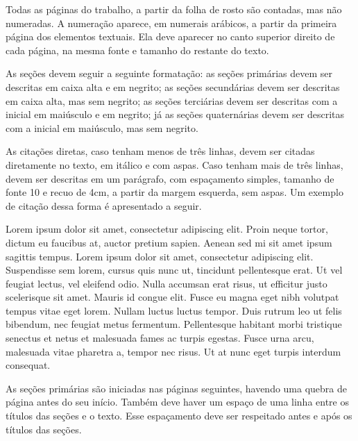 Todas as páginas do trabalho, a partir da folha de rosto são contadas, mas não numeradas. A numeração aparece, em numerais arábicos, a partir da primeira página dos elementos textuais. Ela deve aparecer no canto superior direito de cada página, na mesma fonte e tamanho do restante do texto.

As seções devem seguir a seguinte formatação: as seções primárias devem ser descritas em caixa alta e em negrito; as seções secundárias devem ser descritas em caixa alta, mas sem negrito; as seções terciárias devem ser descritas com a inicial em maiúsculo e em negrito; já as seções quaternárias devem ser descritas com a inicial em maiúsculo, mas sem negrito.

As citações diretas, caso tenham menos de três linhas, devem ser citadas diretamente no texto, em itálico e com aspas. Caso tenham mais de três linhas, devem ser descritas em um parágrafo, com espaçamento simples, tamanho de fonte 10 e recuo de 4cm, a partir da margem esquerda, sem aspas. Um exemplo de citação dessa forma é apresentado a seguir.

\begin{citacao}
Lorem ipsum dolor sit amet, consectetur adipiscing elit. Proin neque tortor, dictum eu faucibus at, auctor pretium sapien. Aenean sed mi sit amet ipsum sagittis tempus. Lorem ipsum dolor sit amet, consectetur adipiscing elit. Suspendisse sem lorem, cursus quis nunc ut, tincidunt pellentesque erat. Ut vel feugiat lectus, vel eleifend odio. Nulla accumsan erat risus, ut efficitur justo scelerisque sit amet. Mauris id congue elit. Fusce eu magna eget nibh volutpat tempus vitae eget lorem. Nullam luctus luctus tempor. Duis rutrum leo ut felis bibendum, nec feugiat metus fermentum. Pellentesque habitant morbi tristique senectus et netus et malesuada fames ac turpis egestas. Fusce urna arcu, malesuada vitae pharetra a, tempor nec risus. Ut at nunc eget turpis interdum consequat.
\end{citacao}{}

As seções primárias são iniciadas nas páginas seguintes, havendo uma quebra de página antes do seu início. Também deve haver um espaço de uma linha entre os títulos das seções e o texto. Esse espaçamento deve ser respeitado antes e após os títulos das seções.